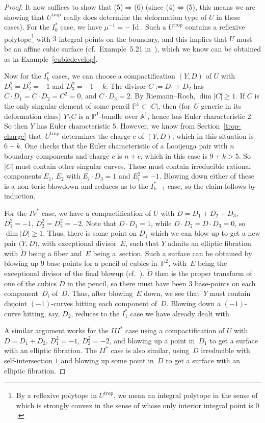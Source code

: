 \documentclass[10pt,a4paper]{amsart}
\numberwithin{equation}{section}
\numberwithin{figure}{section}
\numberwithin{table}{section}
\DeclareMathOperator{\Id}{Id}
\DeclareMathOperator{\trop}{trop}
\let\?=\overline
\let\bb=\mathbb
\let\wt=\widetilde
\theoremstyle{definition}
\begin{document}
\begin{proof}
It now suffices to show that (5)$\Rightarrow$(6) (since (4)$\Leftrightarrow$(5), this means we are showing that $U^{\trop}$ really does determine the deformation type of $U$ in these cases). For the $I_0^*$ case, we have $\mu^{-1}=-\Id$. Such a $U^{\trop}$ contains a reflexive polytope\footnote{By a reflexive polytope in $U^{\trop}$, we mean an integral polytope in the sense of \cite[Definition~2.10]{Man1} which is strongly convex in the sense of \cite[Definition~5.4]{Man1} whose only interior integral point is $0$.} with $3$ integral points on the boundary, and this implies that $U$ must be an affine cubic surface (cf.\ Example~5.21 in~\cite{Man1}), which we know can be obtained as in Example~\ref{cubicdevelop}.

Now for the $I_k^*$ cases, we can choose a compactification $(Y,D)$ of $U$ with $D_1^2=D_2^2=-1$ and $D_3^2=-1-k$. The divisor $C:=D_1+D_2$ has $C\cdot D_1=C\cdot D_2 = C^2 = 0$, and $C\cdot D_3 = 2$. By Riemann--Roch, $\dim |C|\geq 1$. If $C$ is the only singular element of some pencil $\bb{P}^1\subset |C|$, then (for~$U$ generic in its deformation class) $Y\setminus C$ is a $\bb{P}^1$-bundle over $\bb{A}^1$, hence has Euler characteristic $2$. So then $Y$ has Euler characteristic $5$. However, we know from Section~\ref{trop-charge} that~$U^{\trop}$ determines the charge $c$ of $(Y,D)$, which in this situation is $6+k$. One checks that the Euler characteristic of a Looijenga pair with $n$ boundary components and charge $c$ is $n+c$, which in this case is $9+k > 5$. So $|C|$ must contain other singular curves. These must contain irreducible rational components $E_1$, $E_2$ with $E_i\cdot D_3 = 1$ and $E_i^2=-1$. Blowing down either of these is a non-toric blowdown and reduces us to the $I_{k-1}^*$ case, so the claim follows by induction.

For the $IV^*$ case, we have a compactification of $U$ with $D=D_1+D_2+D_3$, $D_1^2=-1$, $D_2^2=D_3^2 = -2$. Note that $D\cdot D_1=1$, while $D\cdot D_2=D\cdot D_3 = 0$, so $\dim |D|\geq 1$. Thus, there is some point on $D_1$ which we can blow up to get a new pair $\big(\wt{Y},\wt{D}\big)$, with exceptional divisor~$E$, such that $\wt{Y}$ admits an elliptic fibration with $\wt{D}$ being a fiber and~$E$ being a~section. Such a surface can be obtained by blowing up $9$ base-points for a pencil of cubics in~$\bb{P}^2$, with~$E$ being the exceptional divisor of the final blowup (cf.~\cite{HL}). $\wt{D}$ then is the proper transform of one of the cubics $\?{D}$ in the pencil, so there must have been $3$ base-points on each component~$\?{D}_i$ of~$\?{D}$. Thus, after blowing~$E$ down, we see that~$Y$ must contain disjoint $(-1)$-curves hitting each component of~$D$. Blowing down a $(-1)$-curve hitting, say, $D_2$, reduces to the $I_1^*$ case we have already dealt with.

A similar argument works for the $III^*$ case using a compactification of $U$ with $D=D_1+D_2$, $D_1^2=-1$, $D_2^2 = -2$, and blowing up a point in~$D_1$ to get a surface with an elliptic fibration. The $II^*$ case is also similar, using~$D$ irreducible with self-intersection $1$ and blowing up some point in~$D$ to get a surface with an elliptic fibration.
\end{proof}
\end{document}
